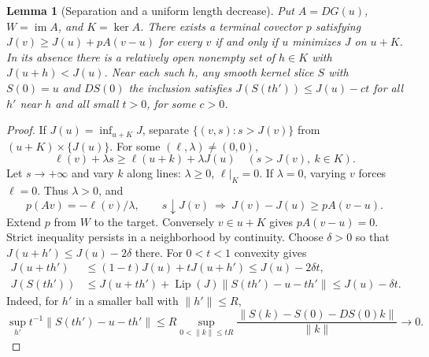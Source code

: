 \documentclass[11pt,letterpaper]{article}
\newtheorem{lemma}[theorem]{Lemma}
\newcommand{\im}{\operatorname{im}}
\begin{document}
\begin{lemma}[Separation and a uniform length decrease]\label{support}
Put $A=DG(u)$, $W=\im A$, and $K=\ker A$. There exists a terminal covector
$p$ satisfying $J(v)\ge J(u)+pA(v-u)$ for every $v$ if and only if $u$
minimizes $J$ on $u+K$. In its absence there is a relatively open nonempty
set of $h\in K$ with $J(u+h)<J(u)$. Near each such $h$, any smooth
kernel slice $S$ with $S(0)=u$ and $DS(0)$ the inclusion satisfies
$J(S(th'))\le J(u)-ct$ for all $h'$ near $h$ and all small $t>0$,
for some $c>0$.
\end{lemma}
\begin{proof}
If $J(u)=\inf_{u+K}J$, separate $\{(v,s):s>J(v)\}$ from
$(u+K)\times\{J(u)\}$. For some $(\ell,\lambda)\ne(0,0)$,
\[
 \ell(v)+\lambda s\ge\ell(u+k)+\lambda J(u)
 \quad(s>J(v),\ k\in K).
\]
Let $s\to+\infty$ and vary $k$ along lines: $\lambda\ge0$, $\ell|_K=0$.
If $\lambda=0$, varying $v$ forces $\ell=0$. Thus $\lambda>0$, and
\[
 p(Av)=-\ell(v)/\lambda,\qquad
 s\downarrow J(v)\ \Longrightarrow\ J(v)-J(u)\ge pA(v-u).
\]
Extend $p$ from $W$ to the target. Conversely $v\in u+K$ gives $pA(v-u)=0$.
Strict inequality persists
in a neighborhood by continuity. Choose $\delta>0$ so that
$J(u+h')\le J(u)-2\delta$ there. For $0<t<1$ convexity gives
\begin{equation}\label{slice-saving}
 \begin{aligned}
 J(u+th')&\le(1-t)J(u)+tJ(u+h')\le J(u)-2\delta t,\\
 J(S(th'))&\le J(u+th')+\operatorname{Lip}(J)\|S(th')-u-th'\|
             \le J(u)-\delta t .
 \end{aligned}
\end{equation}
Indeed, for $h'$ in a smaller ball with $\|h'\|\le R$,
\[
 \sup_{h'}t^{-1}\|S(th')-u-th'\|
 \le R\sup_{0<\|k\|\le tR}
       \frac{\|S(k)-S(0)-DS(0)k\|}{\|k\|}
 \longrightarrow0 .
\]
\end{proof}
\end{document}
